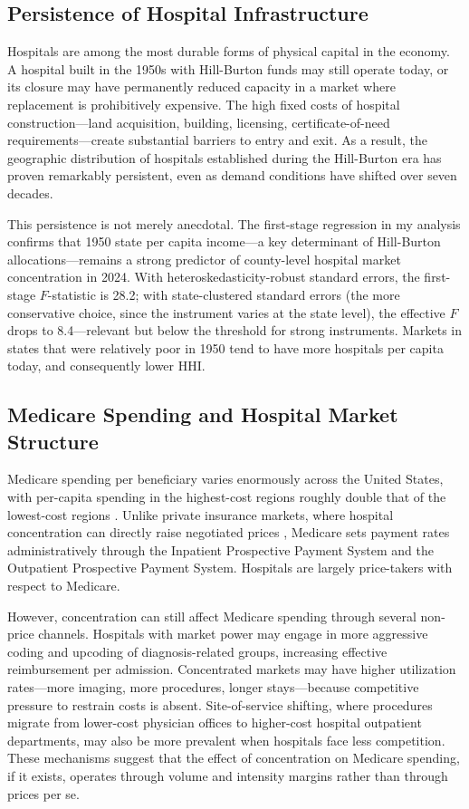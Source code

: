 \documentclass[12pt]{article}
\begin{document}
\subsection{Persistence of Hospital Infrastructure}

Hospitals are among the most durable forms of physical capital in the economy. A hospital built in the 1950s with Hill-Burton funds may still operate today, or its closure may have permanently reduced capacity in a market where replacement is prohibitively expensive. The high fixed costs of hospital construction---land acquisition, building, licensing, certificate-of-need requirements---create substantial barriers to entry and exit. As a result, the geographic distribution of hospitals established during the Hill-Burton era has proven remarkably persistent, even as demand conditions have shifted over seven decades.

This persistence is not merely anecdotal. The first-stage regression in my analysis confirms that 1950 state per capita income---a key determinant of Hill-Burton allocations---remains a strong predictor of county-level hospital market concentration in 2024. With heteroskedasticity-robust standard errors, the first-stage $F$-statistic is 28.2; with state-clustered standard errors (the more conservative choice, since the instrument varies at the state level), the effective $F$ drops to 8.4---relevant but below the \citet{stock2005testing} threshold for strong instruments. Markets in states that were relatively poor in 1950 tend to have more hospitals per capita today, and consequently lower HHI.

\subsection{Medicare Spending and Hospital Market Structure}

Medicare spending per beneficiary varies enormously across the United States, with per-capita spending in the highest-cost regions roughly double that of the lowest-cost regions \citep{wennberg1989dartmouth}. Unlike private insurance markets, where hospital concentration can directly raise negotiated prices \citep{cooper2019prices}, Medicare sets payment rates administratively through the Inpatient Prospective Payment System and the Outpatient Prospective Payment System. Hospitals are largely price-takers with respect to Medicare.

However, concentration can still affect Medicare spending through several non-price channels. Hospitals with market power may engage in more aggressive coding and upcoding of diagnosis-related groups, increasing effective reimbursement per admission. Concentrated markets may have higher utilization rates---more imaging, more procedures, longer stays---because competitive pressure to restrain costs is absent. Site-of-service shifting, where procedures migrate from lower-cost physician offices to higher-cost hospital outpatient departments, may also be more prevalent when hospitals face less competition. These mechanisms suggest that the effect of concentration on Medicare spending, if it exists, operates through volume and intensity margins rather than through prices per se.
\end{document}
